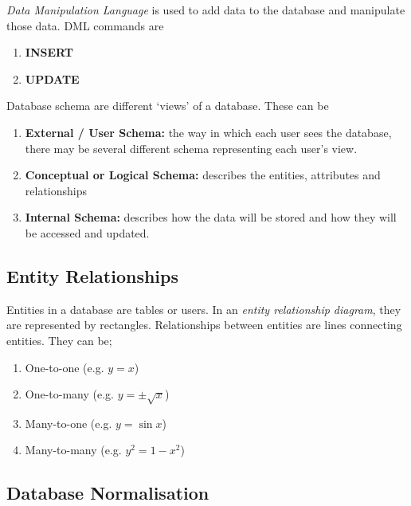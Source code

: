 \documentclass{article}
\begin{document}
\textit{Data Manipulation Language} is used to add data to the
database and manipulate those data. DML commands are\begin{enumerate}

    \item \textbf{INSERT}
    
    \item \textbf{UPDATE}

\end{enumerate}

Database schema are different `views' of a database. These can
be \begin{enumerate}

    \item \textbf{External / User Schema:} the way in which each user sees the
        database, there may be several different schema representing each user's
        view.
    
    \item \textbf{Conceptual or Logical Schema:} describes the entities,
        attributes and relationships
    
    \item \textbf{Internal Schema:} describes how the data will be stored and
        how they will be accessed and updated.

\end{enumerate}

\subsection{Entity Relationships}

Entities in a database are tables or users. In an \textit{entity relationship
diagram}, they are represented by rectangles. Relationships between entities are
lines connecting entities. They can be;\begin{enumerate}

    \item One-to-one (e.g. $y=x$)
    
    \item One-to-many (e.g. $y=\pm\sqrt x$)
    
    \item Many-to-one (e.g. $y=\sin x$)
    
    \item Many-to-many (e.g. $y^2=1-x^2$)

\end{enumerate}

\subsection{Database Normalisation}
\end{document}
